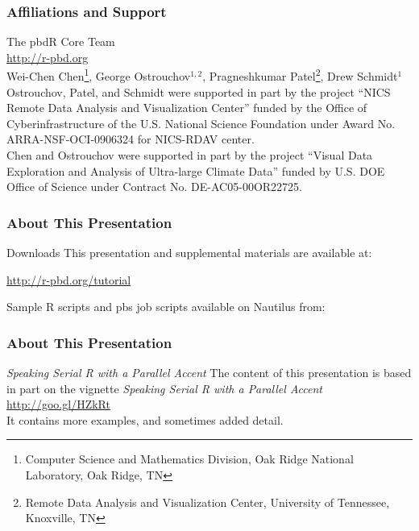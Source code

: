 \frame{
  \maketitle
}

\begin{frame}[noframenumbering]
\frametitle{Affiliations and Support}
{\small
The pbdR Core Team\\ \url{http://r-pbd.org}
\\[.4cm]
Wei-Chen Chen\footnote{\tiny{Computer Science and Mathematics Division, Oak Ridge National Laboratory, Oak Ridge, TN}}, 
George Ostrouchov$^{1,2}$, 
Pragneshkumar Patel\footnote{\tiny{Remote Data Analysis and Visualization Center, University of Tennessee, Knoxville, TN}}, 
Drew Schmidt$^1$
\\[.4cm]
Ostrouchov, Patel, and Schmidt were supported in part by the project
``NICS Remote Data Analysis and Visualization Center''
funded by the Office of Cyberinfrastructure of the
U.S. National Science Foundation
under Award No. ARRA-NSF-OCI-0906324 for NICS-RDAV center.\\[.4cm]
Chen and Ostrouchov were supported in part by the project
``Visual Data Exploration and Analysis of Ultra-large Climate Data''
funded by U.S. DOE Office of Science
under Contract No. DE-AC05-00OR22725.\\
}
\end{frame}

\begin{frame}
\frametitle{About This Presentation}
 \begin{block}{Downloads}
  This presentation and supplemental materials are available at:
  \begin{center}
  \url{http://r-pbd.org/tutorial}
  \end{center}
  Sample R scripts and pbs job scripts available on Nautilus from:\\
  \centering{}
 \end{block}
\end{frame}


\begin{frame}
\frametitle{About This Presentation}
 \begin{block}{\emph{Speaking Serial R with a Parallel Accent}}
  The content of this presentation is based in part on the  
vignette \emph{Speaking Serial R with a Parallel Accent}\\[.4cm]
  \url{http://goo.gl/HZkRt}\\[.4cm]
  It contains more examples, and sometimes added detail.
 \end{block}
\end{frame}


